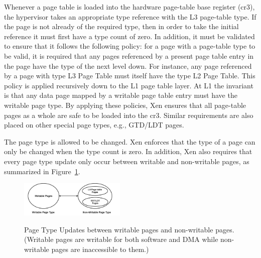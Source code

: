Whenever a page table is loaded into the hardware page-table base register (cr3),
the hypervisor takes an appropriate type reference with the L3 page-table type.
If the page is not already of the required type, then in order to take the initial reference it must first have a type count of zero.
In addition, it must be validated to ensure that it follows the following policy:
for a page with a page-table type to be valid, it is required that any pages referenced
by a present page table entry in the page have the type of the next level down.
For instance, any page referenced by a page with type L3 Page Table must itself have the type L2 Page Table.
This policy is applied recursively down to the L1 page table layer.
At L1 the invariant is that any data page mapped by a writable page table entry must have the writable page type.
By applying these policies, Xen ensures that all page-table pages as a whole are safe to be loaded into the cr3.
Similar requirements are also placed on other special page types, e.g., GTD/LDT pages.

The page type is allowed to be changed.
Xen enforces that the type of a page can only be changed when the type count is zero.
In addition, Xen also requires that every page type update only occur between writable and non-writable pages, as summarized in Figure~\ref{fig:page-type-updates}.


\begin{figure}[ht]
\centering
\includegraphics[width=0.45\textwidth]{image/background/page-type-updates.png} \\
\caption{Page Type Updates between writable pages and non-writable pages. (Writable pages are writable for both software and DMA
while non-writable pages are inaccessible to them.)}
\label{fig:page-type-updates}
\end{figure}



